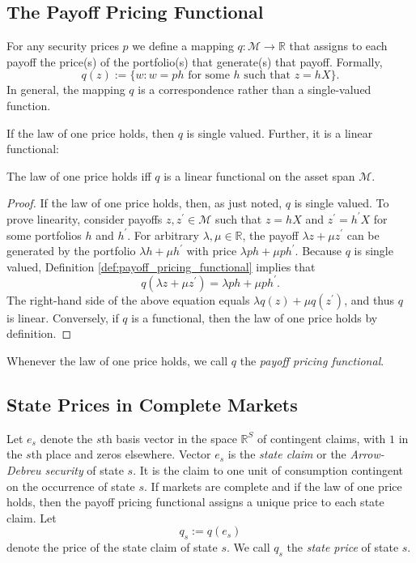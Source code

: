 \documentclass[\topdir/lecture\_notes.tex]{subfiles}
\begin{document}
\subsection{The Payoff Pricing Functional}
For any security prices \(p\) we define a mapping \(q: \mathcal{M} \rightarrow \mathbb{R}\) that assigns to each payoff the price(s) of the portfolio(s) that generate(s) that payoff. Formally,
\begin{equation}
q(z) :=\{w: w=p h \text { for some } h \text { such that } z=h X\}. \label{def:payoff_pricing_functional}
\end{equation}
In general, the mapping \(q\) is a correspondence rather than a single-valued function.

If the law of one price holds, then \(q\) is single valued. Further, it is a linear functional:
\begin{theorem}\label{thm:law_of_one_price_linearity}
The law of one price holds iff \(q\) is a linear functional on the asset span \(\mathcal{M}\).
\end{theorem}
\begin{proof}
If the law of one price holds, then, as just noted, \(q\) is single valued. To prove linearity, consider payoffs \(z, z^{\prime} \in \mathcal{M}\) such that \(z=h X\) and \(z^{\prime}=h^{\prime} X\) for some portfolios \(h\) and \(h^{\prime}\). For arbitrary \(\lambda, \mu \in \mathbb{R}\), the payoff \(\lambda z+\mu z^{\prime}\) can be generated by the portfolio \(\lambda h+\mu h^{\prime}\) with price \(\lambda p h+\mu p h^{\prime}\). Because \(q\) is single valued, Definition \ref{def:payoff_pricing_functional} implies that
\begin{equation*}
q\left(\lambda z+\mu z^{\prime}\right)=\lambda p h+\mu p h^{\prime} . 
\end{equation*}
The right-hand side of the above equation equals \(\lambda q(z)+\mu q\left(z^{\prime}\right)\), and thus \(q\) is linear. Conversely, if \(q\) is a functional, then the law of one price holds by definition.
\end{proof}

Whenever the law of one price holds, we call \(q\) the \emph{payoff pricing functional}.

\subsection{State Prices in Complete Markets}
Let \(e_{s}\) denote the \(s\)th basis vector in the space \(\mathbb{R}^{S}\) of contingent claims, with \(1\) in the \(s\)th place and zeros elsewhere. Vector \(e_{s}\) is the \emph{state claim} or the \emph{Arrow-Debreu security} of state \(s\). It is the claim to one unit of consumption contingent on the occurrence of state \(s\). If markets are complete and if the law of one price holds, then the payoff pricing functional assigns a unique price to each state claim. Let
\begin{equation*}
q_{s} := q(e_{s})
\end{equation*}
denote the price of the state claim of state \(s\). We call \(q_{s}\) the \emph{state price} of state \(s\).
\end{document}
